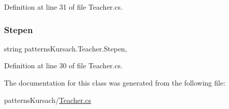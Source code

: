 Definition at line 31 of file Teacher.\+cs.

\mbox{\label{classpatterns_kursach_1_1_teacher_a561b33d8b07eb3bdfe7171d559252973}} 
\subsubsection{\texorpdfstring{Stepen}{Stepen}}
{\footnotesize\ttfamily string patterns\+Kursach.\+Teacher.\+Stepen\hspace{0.3cm}{\ttfamily [get]}, {\ttfamily [set]}}



Definition at line 30 of file Teacher.\+cs.



The documentation for this class was generated from the following file\+:\begin{DoxyCompactItemize}
\item 
patterns\+Kursach/\mbox{\hyperlink{_teacher_8cs}{Teacher.\+cs}}\end{DoxyCompactItemize}
